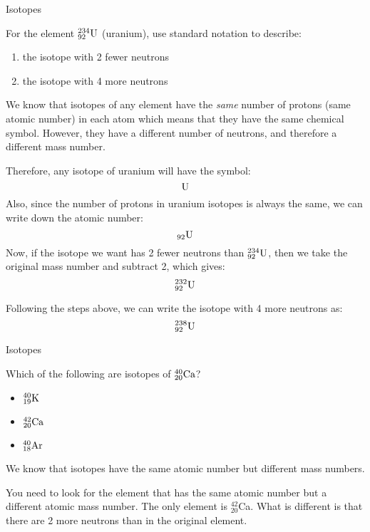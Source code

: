 \begin{wex}{Isotopes }{
For the element $^{234}_{92}{\rm U}$ (uranium), use standard notation to describe:
\begin{enumerate}
 \item the isotope with 2 fewer neutrons
 \item the isotope with 4 more neutrons
\end{enumerate}}

{
We know that isotopes of any element have the \emph{same} number
of protons (same atomic number) 
in each atom which means that they have the same chemical symbol. However, they have a different number of neutrons, and therefore a different mass number.\\}

{
Therefore, any isotope of uranium will have the symbol:
 $$
	\rm{U}
 $$
 Also, since the number of protons in uranium isotopes is always the same, we can write
 down the atomic number:
 $$
	_{92}\rm{U}
 $$ 
 Now, if the isotope we want has 2 fewer neutrons than $^{234}_{92}\rm{U}$, 
	then we take the original mass number and subtract 2, which gives:
 $$
	^{232}_{92}\rm{U}
 $$  

Following the steps above, we can write the isotope with 4 more neutrons as:
 $$
	^{238}_{92}\rm{U}
 $$} 
\end{wex}

\begin{wex}{Isotopes}
{ Which of the following are isotopes of $^{40}_{20}\rm{Ca}$?
\begin{itemize}
 \item $^{40}_{19}\rm{K}$
 \item $^{42}_{20}\rm{Ca}$
 \item $^{40}_{18}\rm{Ar}$
\end{itemize}}

{

We know that isotopes have the same atomic number but different mass numbers.\\}

{
You need to look for the element that has the same atomic number but a different atomic mass number. The only element is $^{42}_{20}$Ca. What is different is that there are 2 more neutrons than in the original element.
}
\end{wex}

